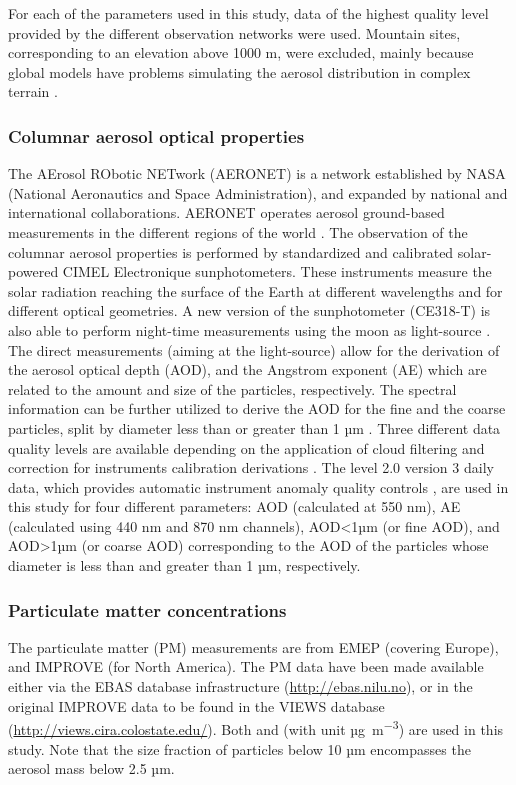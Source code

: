 \documentclass[acp, manuscript]{copernicus}
\begin{document}
For each of the parameters used in this study, data of the highest quality level provided by the different observation networks were used. Mountain sites, corresponding to an elevation above 1000 m, were excluded, mainly because global models have problems simulating the aerosol distribution in complex terrain \citep{kinne2013mac}.

\subsubsection{Columnar aerosol optical properties}

The AErosol RObotic NETwork (AERONET) is a network established by NASA (National Aeronautics and Space Administration), and expanded by national and international collaborations. AERONET operates aerosol ground-based measurements in the different regions of the world \citep{holben2001emerging}. The observation of the columnar aerosol properties is performed by standardized and calibrated solar-powered CIMEL Electronique sunphotometers. These instruments measure the solar radiation reaching the surface of the Earth at different wavelengths and for different optical geometries. A new version of the sunphotometer (CE318-T) is also able to perform night-time measurements using the moon as light-source \citep{barreto2016new}. The direct measurements (aiming at the light-source) allow for the derivation of the aerosol optical depth (AOD), and the Angstrom exponent (AE) which are related to the amount and size of the particles, respectively. The spectral information can be further utilized to derive the AOD for the fine and the coarse particles, split by diameter less than or greater than 1 µm \citep{o2003spectral}. Three different data quality levels are available depending on the application of cloud filtering and correction for instruments calibration derivations \citep{smirnov2000cloud,smirnov2004aeronet}. The level 2.0 version 3 daily data, which provides automatic instrument anomaly quality controls \citep{giles2019advancements}, are used in this study for four different parameters:
AOD (calculated at 550 nm), AE (calculated using 440 nm and 870 nm channels), AOD<1µm (or fine AOD), and AOD>1µm (or coarse AOD) corresponding to the AOD of the particles whose diameter is less than and greater than 1 µm, respectively.

\subsubsection{Particulate matter concentrations}
The particulate matter (PM) measurements are from EMEP (covering Europe), and IMPROVE (for North America). The PM data have been made available either via the EBAS database infrastructure  (\url{http://ebas.nilu.no}), or in the original IMPROVE data to be found in the VIEWS database (\url{http://views.cira.colostate.edu/}). Both  and  (with unit \unit{µg.m^{-3}}) are used in this study. Note that the  size fraction of particles below 10 µm encompasses the  aerosol mass below 2.5 µm. 
\end{document}
